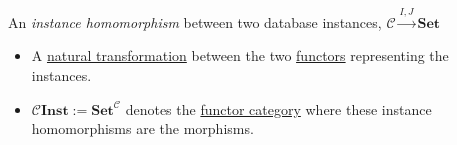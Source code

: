 An \emph{instance homomorphism} between two database instances, $\mathcal{C}\xrightarrow{I,J}\mathbf{Set}$

\begin{itemize}
    \item  A \hyperref[D3.49]{natural transformation} between the two \hyperref[D3.35]{functors} representing the instances.
    \item $\mathcal{C}\mathbf{Inst}:=\mathbf{Set}^\mathcal{C}$ denotes the \hyperref[D3.54]{functor category} where these instance homomorphisms are the morphisms.

  \end{itemize}
